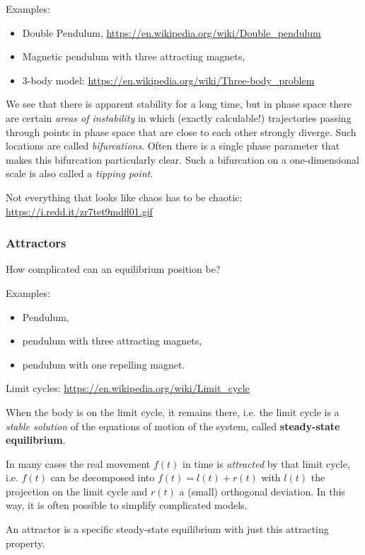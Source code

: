 \documentclass[11pt,a4paper]{article}
\begin{document}
Examples: 
\begin{itemize}
\item Double Pendulum, \url{https://en.wikipedia.org/wiki/Double_pendulum}
\item Magnetic pendulum with three attracting magnets,
\item 3-body model: \url{https://en.wikipedia.org/wiki/Three-body_problem}
\end{itemize}

We see that there is apparent stability for a long time, but in phase space
there are certain \emph{areas of instability} in which (exactly calculable!)
trajectories passing through points in phase space that are close to each
other strongly diverge. Such locations are called \emph{bifurcations}.  Often
there is a single phase parameter that makes this bifurcation particularly
clear. Such a bifurcation on a one-dimensional scale is also called a
\emph{tipping point}.

Not everything that looks like chaos has to be chaotic:\\
\url{https://i.redd.it/zr7tet9mdfl01.gif}

\subsubsection*{Attractors}

How complicated can an equilibrium position be? 

Examples: 
\begin{itemize}
\item Pendulum,
\item pendulum with three attracting magnets,
\item pendulum with one repelling magnet.
\end{itemize}

Limit cycles: \url{https://en.wikipedia.org/wiki/Limit_cycle}

When the body is on the limit cycle, it remains there, i.e. the limit cycle is
a \emph{stable solution} of the equations of motion of the system, called
\textbf{steady-state equilibrium}.
    
In many cases the real movement $f(t)$ in time is \emph{attracted} by that
limit cycle, i.e. $f(t)$ can be decomposed into $f(t)=l(t)+r(t)$ with $l(t)$
the projection on the limit cycle and $r(t)$ a (small) orthogonal deviation.
In this way, it is often possible to simplify complicated models.

An attractor is a specific steady-state equilibrium with just this attracting
property.
\end{document}
